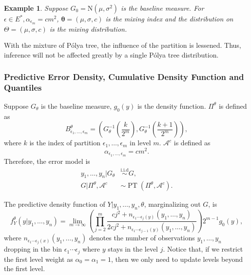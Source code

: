 \documentclass[12pt]{article}
\newtheorem{emp}[thm]{Example}
\newcommand{\polya}{P\'{o}lya}
\newcommand{\iid}{\stackrel{\mbox{i.i.d}}{\sim}}
\DeclareMathOperator{\pt}{PT}
\begin{document}
\begin{emp}
  Suppose $G_0 = \mathrm{N}(\mu, \sigma^2)$ is the baseline measure.
  For $\epsilon \in E^{*}, \alpha_{\epsilon_m} = cm^2 $, $\bm{\theta}=
  (\mu, \sigma, c)$ is the mixing index and the distribution on
  $\Theta = (\mu, \sigma, c) $ is the mixing distribution.
\end{emp}
With the mixture of \polya{} tree, the influence of the partition is
lessened. Thus, inference will not be affected greatly by a single
\polya{} tree distribution.

\subsubsection{Predictive Error Density, Cumulative Density Function
  and Quantiles}
Suppose $G_{\theta}$ is the baseline
measure, $g_0(y)$ is the density
function. $\Pi^{\theta}$ is defined as
\begin{displaymath}
  B^{\theta}_{\epsilon_1, \ldots, \epsilon_m} = \left( G^{-1}_{\theta}
    \left( \frac{k}{2^m} \right), G^{-1}_{\theta}\left( \frac{k+1}{2^m} \right) \right),
\end{displaymath}
where $k$ is the index of partition $\epsilon_1, \ldots, \epsilon_m$
in level $m$. $\mathcal{A}^c$ is defined as
\begin{displaymath}
  \alpha_{\epsilon_1, \ldots, \epsilon_m} = cm^2.
\end{displaymath}
Therefore, the error model is
\begin{align*}
  y_1, \ldots, y_n |G_{\theta} & \iid G, \\
  G|\Pi^{\theta}, \mathcal{A}^{c} & \sim \pt (\Pi^{\theta},
  \mathcal{A}^{c}).
\end{align*}

The predictive density function of $Y|y_1, \ldots, y_n, \theta$,
marginalizing out $G$, is
\begin{equation}
  \label{ch2:eq:pred}
  f_Y^{\theta} (y|y_1, \ldots, y_n)  = \lim_{m \to \infty} \left(
    \prod_{j=2}^m \frac{cj^2 + n_{\epsilon_1 \cdots \epsilon_j(y) }(y_1, \ldots, y_n)}{2cj^2
      + n_{\epsilon_1 \cdots \epsilon_{j-1}(y)}(y_1, \ldots, y_n)}
  \right)2^{m-1} g_0(y),
\end{equation}
where $n_{\epsilon_1 \cdots \epsilon_j(x) }(y_1, \ldots, y_n)$
denotes the number of observations $y_1, \ldots, y_n$ dropping in the
bin $\epsilon_1 \cdots \epsilon_j$ where $y$ stays in the level
$j$. Notice that, if we restrict the first level weight as
$\alpha_0=\alpha_1=1$, then we only need to update levels beyond
the first level.
\end{document}
